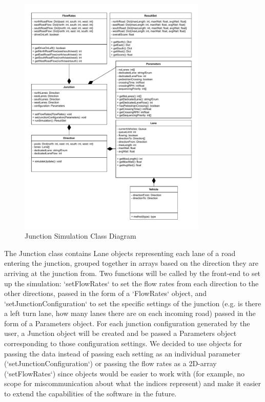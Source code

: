 \documentclass{article}
\begin{document}
\begin{figure}[H]
    \centering
    \includegraphics[width=0.8\textwidth]{JunctionSimulationClassDiagram.drawio.pdf}
    \caption{Junction Simulation Class Diagram}
    \label{class diagram}
\end{figure}

The Junction class contains Lane objects representing each lane of a road entering the junction, grouped together in arrays based on 
the direction they are arriving at the junction from. Two functions will be called by the front-end to set up the simulation: `setFlowRates` 
to set the flow rates from each direction to the other directions, passed in the form of a `FlowRates` object, and `setJunctionConfiguration` 
to set the specific settings of the junction (e.g. is there a left turn lane, how many lanes there are on each incoming road) passed in 
the form of a Parameters object. For each junction configuration generated by the user, a Junction object will be created and be passed 
a Parameters object corresponding to those configuration settings. We decided to use objects for passing the data instead of passing each 
setting as an individual parameter (`setJunctionConfiguration`) or passing the flow rates as a 2D-array (`setFlowRates`) since objects would 
be easier to work with (for example, no scope for miscommunication about what the indices represent) and make it easier to extend the 
capabilities of the software in the future.
\end{document}
